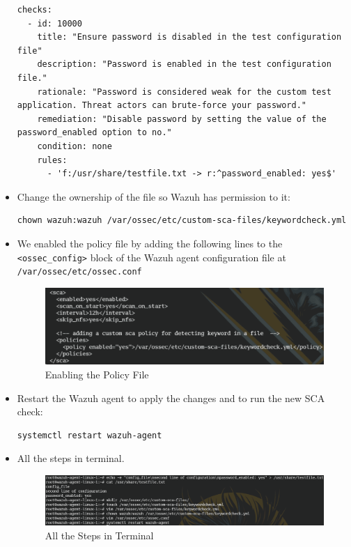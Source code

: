 \begin{itemize}
\begin{verbatim}
checks:
  - id: 10000
    title: "Ensure password is disabled in the test configuration file"
    description: "Password is enabled in the test configuration file."
    rationale: "Password is considered weak for the custom test application. Threat actors can brute-force your password."
    remediation: "Disable password by setting the value of the password_enabled option to no."
    condition: none
    rules:
      - 'f:/usr/share/testfile.txt -> r:^password_enabled: yes$'
        \end{verbatim}

    \item Change the ownership of the file so Wazuh has permission to it:
          \begin{verbatim}
chown wazuh:wazuh /var/ossec/etc/custom-sca-files/keywordcheck.yml
        \end{verbatim}


    \item We enabled the policy file by adding the following lines to the \texttt{<ossec\_config>} block of the Wazuh agent configuration file at \texttt{/var/ossec/etc/ossec.conf}
          \begin{figure} [H]
              \centering
              \includegraphics[width=\textwidth]{images/sca/sca-3.png}
              \caption{Enabling the Policy File}
              \label{fig:sca-3}
          \end{figure}

    \item Restart the Wazuh agent to apply the changes and to run the new SCA check:
          \begin{verbatim}
systemctl restart wazuh-agent
        \end{verbatim}

    \item All the steps in terminal.
          \begin{figure} [H]
              \centering
              \includegraphics[width=\textwidth]{images/sca/sca-4.png}
              \caption{All the Steps in Terminal}
              \label{fig:sca-4}
          \end{figure}

\end{itemize}

